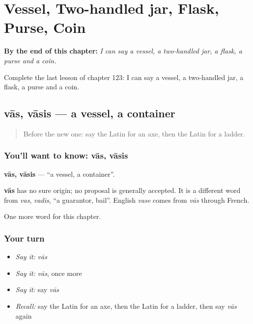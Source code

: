 
\chapter{Vessel, Two-handled jar, Flask, Purse, Coin}
\label{ch:la-vessel-two-handled-jar-flask-purse-coin}

\begin{chapteropening}
\textbf{By the end of this chapter:} \emph{I can say a vessel, a two-handled jar, a flask, a purse and a coin.}

Complete the last lesson of chapter 123: I can say a vessel, a two-handled jar, a flask, a purse and a coin.
\end{chapteropening}

\section[vās, vāsis]{vās, vāsis — a vessel, a container}

\label{lesson:LA-C123-vas}



\begin{quote}
Before the new one: say the Latin for an axe, then the Latin for a ladder.
\end{quote}

\subsection*{You'll want to know: vās, vāsis}
\textbf{vās, vāsis} — \textquotedblleft{}a vessel, a container\textquotedblright{}.

\begin{cousinweb}
\textbf{vās} has no sure origin; no proposal is generally accepted. It is a different word from \emph{vas}, \emph{vadis}, \textquotedblleft{}a guarantor, bail\textquotedblright{}. English \emph{vase} comes from \emph{vās} through French.
\end{cousinweb}

\begin{grammarlens}[title={What you've built}]
One more word for this chapter.
\end{grammarlens}

\subsection*{Your turn}
\begin{itemize}
\raggedright
  \item \emph{Say it:} \emph{vās}
  \item \emph{Say it:} \emph{vās}, once more
  \item \emph{Say it:} say \emph{vās}
  \item \emph{Recall:} say the Latin for an axe, then the Latin for a ladder, then say \emph{vās} again
\end{itemize}

